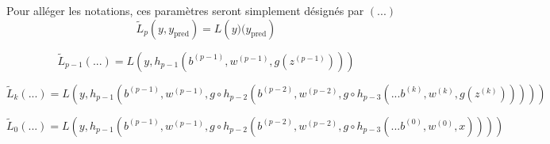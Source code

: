 \begin{itemize}
					\[\]
					
					Pour alléger les notations, ces paramètres seront simplement désignés par $(...)$\\

					
					\[\tilde{L}_p(y, y_\text{pred}) = L\left(y)(y_\text{pred}\right)\]
					
					\[\tilde{L}_{p - 1}(...) = L\left(
					                                  y, h_{p-1}\left(
					                                                    b^{(p-1)}, w^{(p-1)}, g\left(z^{(p-1)}
					                                                                           \right)
																												\right)
					                            \right)\]
					
					\[\tilde{L}_k(...) = L\left(
																	y, h_{p-1}\left(
																							b^{(p-1)}, w^{(p-1)}, g\circ h_{p-2}\left(
																																										b^{(p-2)}, w^{(p-2)}, g\circ h_{p-3}\left(...
																																																													b^{(k)}, w^{(k)}, g\left(z^{(k)}\right)
																																																													\right)
																																										\right)
																							\right)
														\right)\]
																				
					\[\tilde{L}_0(...) = L\left(
																	y, h_{p-1}\left(
																							b^{(p-1)}, w^{(p-1)}, g\circ h_{p-2}\left(
																																										b^{(p-2)}, w^{(p-2)}, g\circ h_{p-3}\left(...
																																																													b^{(0)}, w^{(0)}, x
																																																												\right)
																																										\right)
																							\right)
														\right)\]\\
	            
	\end{itemize}
	
